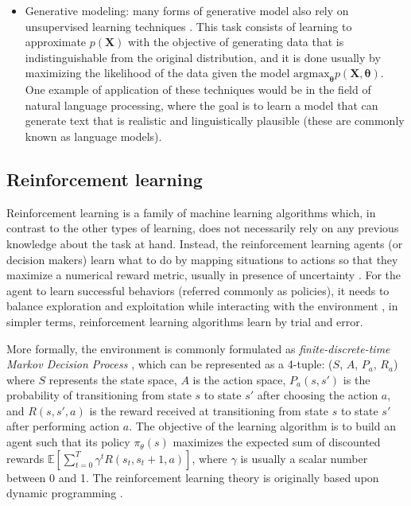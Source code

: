 \begin{itemize}
	\item Generative modeling: many forms of generative model also rely on unsupervised learning techniques \autocite{bishop2006}. This task consists of learning to approximate $p(\mathbf{X})$ with the objective of generating data that is indistinguishable from the original distribution, and it is done usually by maximizing the likelihood of the data given the model $\mathrm{argmax}_\mathbf{\theta} p(\mathbf{\mathbf{X},\mathbf{\theta}})$.  One example of application of these techniques would be in the field of natural language processing, where the goal is to learn a model that can generate text \autocite{uday2019} that is realistic and linguistically plausible (these are commonly known as language models).
\end{itemize}


\subsection{Reinforcement learning}
Reinforcement learning is a family of machine learning algorithms which, in contrast to the other types of learning, does not necessarily rely on any previous knowledge about the task at hand. Instead, the reinforcement learning agents (or decision makers) learn what to do by mapping situations to actions \autocite{sutton2018} so that they maximize a numerical reward metric, usually in presence of uncertainty \autocite{haykin1998}. For the agent to learn successful behaviors (referred commonly as policies), it needs to balance exploration and exploitation while interacting with the environment \autocite{sutton2018}, in simpler terms, reinforcement learning algorithms learn by trial and error.

More formally, the environment is commonly formulated as \textit{finite-discrete-time Markov Decision Process} \autocite{haykin1998}, which can be represented as a 4-tuple: ($S$, $A$, $P_a$, $R_a$) where $S$ represents the state space, $A$ is the action space, $P_a(s, s')$ is the probability of transitioning from state $s$ to state $s'$ after choosing the action $a$, and $R(s, s', a)$ is the reward received at transitioning from state $s$ to state $s'$ after performing action $a$. The objective of the learning algorithm is to build an agent such that its policy $\pi_\theta(s)$ maximizes the expected sum of discounted rewards $\mathbb{E} \left[ \sum_{t=0}^{T} \gamma^t R(s_t, s_t+1, a) \right]$, where $\gamma$ is usually a scalar number between 0 and 1. The reinforcement learning theory is originally based upon dynamic programming \autocite{szepesvari2010}.

